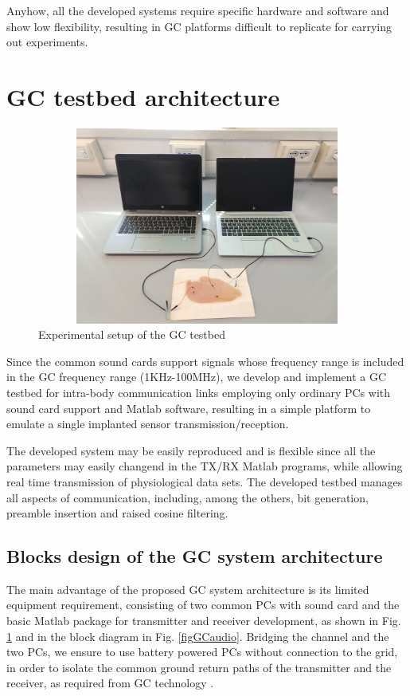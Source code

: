 Anyhow, all the developed systems require specific hardware and software and show low flexibility, resulting in GC platforms difficult to replicate for carrying out experiments.

\section{GC testbed architecture}
\begin{figure}
	\includegraphics[width=13.5cm,height=6.5cm]{figures/GC_testbed/Fig_Architecture_tot_1.jpg}
	\caption{Experimental setup of the GC testbed} \label{figGCtestbed}
\end{figure}

Since the common sound cards support signals whose frequency range is included in the GC frequency range (1KHz-100MHz), we develop and implement a GC testbed for intra-body communication links employing only ordinary PCs with sound card support and Matlab software, resulting in a simple platform to emulate a single implanted sensor transmission/reception.

The developed system may be easily reproduced and is flexible since all the parameters may easily changend in the TX/RX Matlab programs, while allowing real time transmission of physiological data sets. 
The developed testbed manages all aspects of communication, including, among the others, bit generation, preamble insertion and raised cosine filtering.


\subsection{Blocks design of the GC system architecture}
The main advantage of the proposed GC system architecture is its limited equipment requirement, consisting of two common PCs with sound card and the basic Matlab package for transmitter and receiver development, as shown in Fig. \ref{figGCtestbed} and in the block diagram in Fig. \ref{figGCaudio}. Bridging the channel and the two PCs, we ensure to use battery powered PCs without connection to the grid, in order to isolate the common ground return paths of the transmitter and the receiver, as required from GC technology \cite{Banou2018}.

